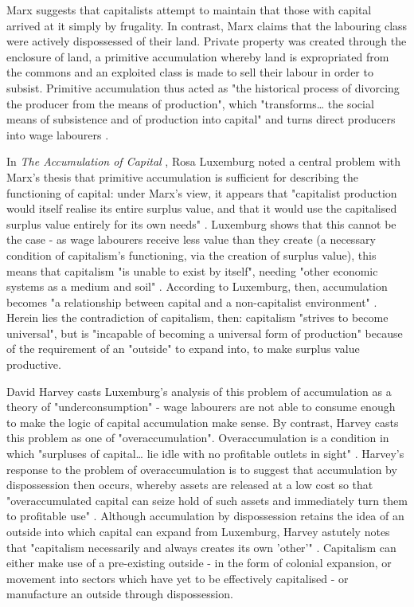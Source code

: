 Marx suggests that capitalists attempt to maintain that those with capital arrived at it simply by frugality. In contrast, Marx claims that the labouring class were actively dispossessed of their land. Private property was created through the enclosure of land, a primitive accumulation whereby land is expropriated from the commons and an exploited class is made to sell their labour  in order to subsist. Primitive accumulation thus acted as "the historical process of divorcing the producer from the means of production", which "transforms\ldots{} the social means of subsistence and of production into capital" and turns direct producers into wage labourers \citep[785]{marx_capital_1889}. 

In \emph{The Accumulation of Capital} \citep{luxemberg_accumulation_2015}, Rosa Luxemburg noted a central problem with Marx's thesis that primitive accumulation is sufficient for describing the functioning of capital: under Marx's view, it appears that "capitalist production would itself realise its entire surplus value, and that it would use the capitalised surplus value entirely for its own needs" \citep[309]{luxemburg_accumulation_2015}. Luxemburg shows that this cannot be the case - as wage labourers receive less value than they create (a necessary condition of capitalism's functioning, via the creation of surplus value), this means that capitalism "is unable to exist by itself", needing "other economic systems as a medium and soil" \citep[447]{luxemburg_accumulation_2015}. According to Luxemburg, then, accumulation becomes "a relationship between capital and a non-capitalist environment" \citep[398]{luxemburg_accumulation_2015}. Herein lies the contradiction of capitalism, then: capitalism "strives to become universal", but is "incapable of becoming a universal form of production" \citep[447]{luxemburg_accumulation_2015} because of the requirement of an "outside" to expand into, to make surplus value productive.

David Harvey casts Luxemburg's analysis of this problem of accumulation as a theory of "underconsumption" - wage labourers are not able to consume enough to make the logic of capital accumulation make sense. By contrast, Harvey casts this problem as one of "overaccumulation". Overaccumulation is a condition in which "surpluses of capital\ldots{} lie idle with no profitable outlets in sight" \citep[149]{harvey_new_2003}. Harvey's response to the problem of overaccumulation is to suggest that accumulation by dispossession then occurs, whereby assets are released at a low cost so that "overaccumulated capital can seize hold of such assets and immediately turn them to profitable use" \citep[149]{harvey_new_2003}. Although accumulation by dispossession retains the idea of an outside into which capital can expand from Luxemburg, Harvey astutely notes that "capitalism necessarily and always creates its own 'other'" \citep[141]{harvey_new_2003}. Capitalism can either make use of a pre-existing outside - in the form of colonial expansion, or movement into sectors which have yet to be effectively capitalised - or manufacture an outside through dispossession.

